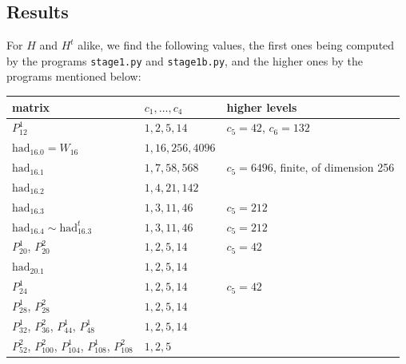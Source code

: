 \documentclass[11pt]{amsart}
\begin{document}
\subsection{Results}\label{sec:realres}

For $H$ and $H^t$ alike, we find the following values, the first ones being computed by the programs \texttt{stage1.py} and \texttt{stage1b.py}, and the higher ones by the programs mentioned below:

\medskip

\begin{center}
\begin{tabular}{lll}
\toprule
matrix & $c_1,\ldots,c_4$ & higher levels\\
\midrule
$P_{12}^1$ & $1,2,5,14$ & $c_5=42$, $c_6=132$\\
$\mathrm{had}_{16.0}=W_{16}$ & $1,16,256,4096$ & \\
$\mathrm{had}_{16.1}$ & $1,7,58,568$ & $c_5=6496$, finite, of dimension 256\\
$\mathrm{had}_{16.2}$ & $1,4,21,142$ & \\
$\mathrm{had}_{16.3}$ & $1,3,11,46$ & $c_5=212$\\
$\mathrm{had}_{16.4}\sim\mathrm{had}_{16.3}^t$ & $1,3,11,46$ & $c_5=212$\\
$P_{20}^1$, $P_{20}^2$ & $1,2,5,14$ & $c_5=42$\\
$\mathrm{had}_{20.1}$ & $1,2,5,14$ & \\
$P_{24}^1$ & $1,2,5,14$ & $c_5=42$\\
$P_{28}^1$, $P_{28}^2$ & $1,2,5,14$ & \\
$P_{32}^1$, $P_{36}^2$, $P_{44}^1$, $P_{48}^1$ & $1,2,5,14$ & \\
$P_{52}^2$, $P_{100}^2$, $P_{104}^1$, $P_{108}^1$, $P_{108}^2$ & $1,2,5$ & \\
\bottomrule
\end{tabular}
\end{center}

\medskip
\end{document}
